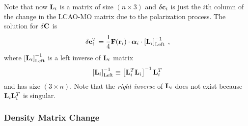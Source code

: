 \documentclass[aip,graphicx]{revtex4-1}
\newcommand{\BM}[1]{\bm{#1}}
\begin{document}
%
Note that now ${\bf L}_i$ is a matrix of size $(n \times 3)$ and $\delta{\bf c}_i$ is just the $i$th column of the
change in the LCAO-MO matrix due to the polarization process.
%
%
The solution for $\delta {\bf C}$ is
%
\begin{equation} \label{e:mu-ind.matrix.linear.solution}
  \delta {\bf c}_i^T = \frac{1}{4}
            {\bf F}({\bf r}_i)  \cdot {\BM{\alpha}}_i \cdot 
                    \left[ {\bf L}_i  \right]^{-1}_{\rm Left} \;,
\end{equation}
%
where $\left[ {\bf L}_i  \right]^{-1}_{\rm Left}$ is a left inverse
of ${\bf L}_i$ matrix 
%
\begin{equation} 
      \left[ {\bf L}_i  \right]^{-1}_{\rm Left}   \equiv
       \left[ {\bf L}_i^T {\bf L}_i \right]^{-1} {\bf L}_i^T 
\end{equation}
%
and has size $(3\times n)$. Note that the \emph{right inverse} of ${\bf L}_i$
does not exist because ${\bf L}_i {\bf L}_i^T$ is singular.

\subsubsection{Density Matrix Change}
\end{document}
